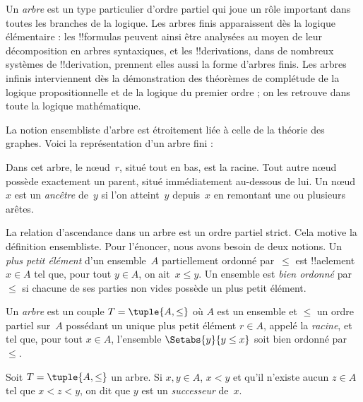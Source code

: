 \documentclass[../../../include/open-logic-section]{subfiles}
\begin{document}

Un \emph{arbre} est un type particulier d’ordre partiel qui joue un rôle
important dans toutes les branches de la logique. Les arbres finis
apparaissent dès la logique élémentaire : les !!{formula}s peuvent ainsi
être analysées au moyen de leur décomposition en arbres syntaxiques,
et les !!{derivation}s, dans de nombreux systèmes de !!{derivation},
prennent elles aussi la forme d’arbres finis.
%
Les arbres infinis interviennent dès la démonstration des théorèmes
de complétude de la logique propositionnelle et de la logique du premier
ordre ; on les retrouve dans toute la logique mathématique.

La notion ensembliste d’arbre est étroitement liée à celle de la théorie
des graphes. Voici la représentation d’un arbre fini :

\begin{center}
\end{center}

Dans cet arbre, le nœud~$r$, situé tout en bas, est la racine.
Tout autre nœud possède exactement un parent, situé immédiatement
au-dessous de lui. Un nœud~$x$ est un \emph{ancêtre} de~$y$ si
l’on atteint~$y$ depuis~$x$ en remontant une ou plusieurs arêtes.
%

La relation d’ascendance dans un arbre est un ordre partiel strict.
Cela motive la définition ensembliste. Pour l’énoncer, nous avons besoin
de deux notions. Un \emph{plus petit élément} d’un ensemble~$A$
partiellement ordonné par~$\le$ est !!a{element} $x \in A$ tel que,
pour tout $y \in A$, on ait~$x \le y$. Un ensemble est \emph{bien ordonné}
par~$\le$ si chacune de ses parties non vides possède un plus petit élément.

\begin{defn}[Arbre]
Un \emph{arbre} est un couple $T = \tuple{A, \le}$ où $A$ est un ensemble
et $\le$ un ordre partiel sur~$A$ possédant un unique plus petit élément
$r \in A$, appelé la \emph{racine}, et tel que, pour tout $x \in A$,
l’ensemble $\Setabs{y}{y \le x}$ soit bien ordonné par~$\le$.
\end{defn}

\begin{defn}[Successeurs]
Soit $T = \tuple{A, \le}$ un arbre. Si $x,y \in A$, $x < y$ et
qu’il n’existe aucun $z \in A$ tel que $x < z < y$, on dit que $y$
est un \emph{successeur} de~$x$.
\end{defn}
\end{document}
